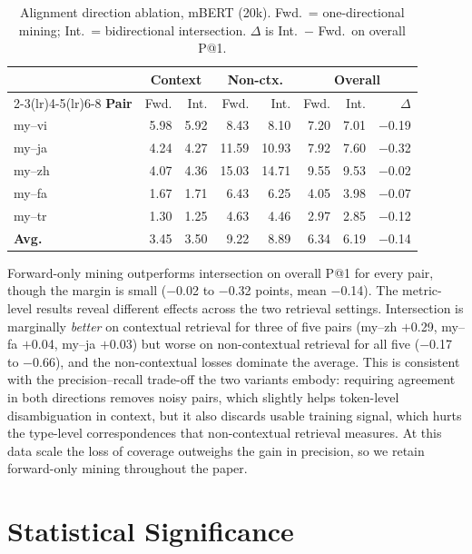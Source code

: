\documentclass[11pt]{article}
\begin{document}
\begin{table}[h]
\centering
\small
\setlength{\tabcolsep}{4pt}
\caption{Alignment direction ablation, mBERT (20k). Fwd.\ = one-directional mining; Int.\ = bidirectional intersection. $\Delta$ is Int.\ $-$ Fwd.\ on overall P@1.}
\label{tab:ablation}
\begin{tabular}{lrrrrrrr}
\toprule
& \multicolumn{2}{c}{\textbf{Context}} & \multicolumn{2}{c}{\textbf{Non-ctx.}} & \multicolumn{3}{c}{\textbf{Overall}} \\
\cmidrule(lr){2-3}\cmidrule(lr){4-5}\cmidrule(lr){6-8}
\textbf{Pair} & Fwd. & Int. & Fwd. & Int. & Fwd. & Int. & $\Delta$ \\
\midrule
my--vi & 5.98 & 5.92 & 8.43  & 8.10  & 7.20 & 7.01 & $-$0.19 \\
my--ja & 4.24 & 4.27 & 11.59 & 10.93 & 7.92 & 7.60 & $-$0.32 \\
my--zh & 4.07 & 4.36 & 15.03 & 14.71 & 9.55 & 9.53 & $-$0.02 \\
my--fa & 1.67 & 1.71 & 6.43  & 6.25  & 4.05 & 3.98 & $-$0.07 \\
my--tr & 1.30 & 1.25 & 4.63  & 4.46  & 2.97 & 2.85 & $-$0.12 \\
\midrule
\textbf{Avg.} & 3.45 & 3.50 & 9.22 & 8.89 & 6.34 & 6.19 & $-$0.14 \\
\bottomrule
\end{tabular}
\end{table}

Forward-only mining outperforms intersection on overall P@1 for every pair, though the margin is small ($-$0.02 to $-$0.32 points, mean $-$0.14). The metric-level results reveal different effects across the two retrieval settings. Intersection is marginally \emph{better} on contextual retrieval for three of five pairs (my--zh $+$0.29, my--fa $+$0.04, my--ja $+$0.03) but worse on non-contextual retrieval for all five ($-$0.17 to $-$0.66), and the non-contextual losses dominate the average. This is consistent with the precision--recall trade-off the two variants embody: requiring agreement in both directions removes noisy pairs, which slightly helps token-level disambiguation in context, but it also discards usable training signal, which hurts the type-level correspondences that non-contextual retrieval measures. At this data scale the loss of coverage outweighs the gain in precision, so we retain forward-only mining throughout the paper.

\section{Statistical Significance}
\label{app:significance}
\end{document}

